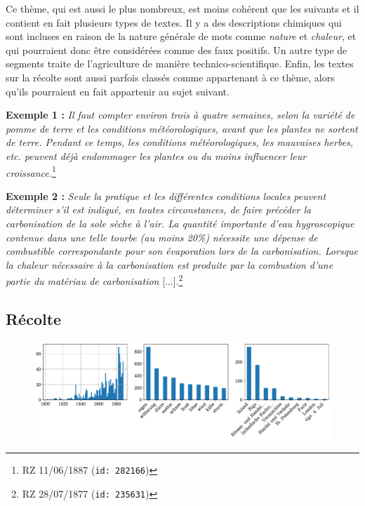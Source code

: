 \documentclass[a4paper,twoside,12pt]{article}
\begin{document}
\noindent Ce thème, qui est aussi le plus nombreux, est moins cohérent que les suivants et il contient en fait plusieurs types de textes. Il y a des descriptions chimiques qui sont incluses en raison de la nature générale de mots comme \textit{nature} et \textit{chaleur}, et qui pourraient donc être considérées comme des faux positifs. Un autre type de segments traite de l'agriculture de manière technico-scientifique. Enfin, les textes sur la récolte sont aussi parfois classés comme appartenant à ce thème, alors qu'ils pourraient en fait appartenir au sujet suivant.

\medskip

\noindent \textbf{Exemple 1 :} \textit{Il faut compter environ trois à quatre semaines, selon la variété de pomme de terre et les conditions météorologiques, avant que les plantes ne sortent de terre. Pendant ce temps, les conditions météorologiques, les mauvaises herbes, etc. peuvent déjà endommager les plantes ou du moins influencer leur croissance.}\footnote{RZ 11/06/1887 (\texttt{id: 282166})}

\noindent \textbf{Exemple 2 :} \textit{Seule la pratique et les différentes conditions locales peuvent déterminer s'il est indiqué, en toutes circonstances, de faire précéder la carbonisation de la sole sèche à l'air. La quantité importante d'eau hygroscopique contenue dans une telle tourbe (au moins 20\%) nécessite une dépense de combustible correspondante pour son évaporation lors de la carbonisation. Lorsque la chaleur nécessaire à la carbonisation est produite par la combustion d'une partie du matériau de carbonisation} [...].\footnote{RZ 28/07/1877 (\texttt{id: 235631})}

\clearpage



\subsection{Récolte} \label{topic2_recolte}

\begin{figure}[H]
\centering
\includegraphics[width=\textwidth]{images/topic_charts_2.pdf}
\end{figure}
\end{document}

